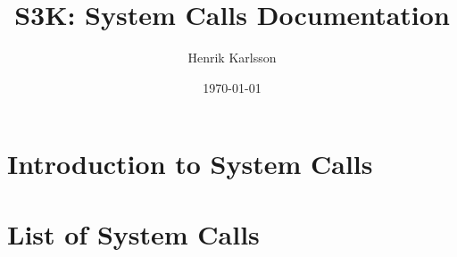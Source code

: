 \documentclass[a4paper,11pt]{article}
\title{S3K: System Calls Documentation}
\author{Henrik Karlsson}
\date{\today}
\newcommand{\syscall}[1]{\texttt{#1}}
\begin{document}
\maketitle
\tableofcontents

\section{Introduction to System Calls}

\section{List of System Calls}

\end{document}
